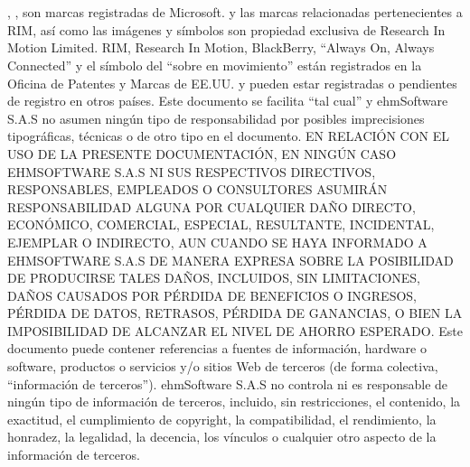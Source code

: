 \chapter{}

\microsoft, \windows, \excel son marcas registradas de Microsoft.
\blackberry y las marcas relacionadas pertenecientes a RIM, as\'i como las
im\'agenes y
s\'imbolos son propiedad exclusiva de Research In Motion Limited. RIM, Research
In
Motion,
BlackBerry, ``Always On, Always Connected'' y el s\'imbolo del ``sobre
en movimiento''
est\'an
registrados en la Oficina de Patentes y Marcas de EE.UU. y pueden estar
registradas o
pendientes de registro en otros pa\'ises.
Este documento se facilita ``tal cual'' y ehmSoftware S.A.S no asumen ning\'un
tipo
de
responsabilidad por posibles imprecisiones tipogr\'aficas, t\'ecnicas o de otro
tipo
en el
documento.
EN RELACI\'ON CON EL USO DE LA PRESENTE DOCUMENTACI\'ON, EN NING\'UN
CASO EHMSOFTWARE S.A.S NI SUS RESPECTIVOS DIRECTIVOS, RESPONSABLES,
EMPLEADOS O CONSULTORES ASUMIR\'AN RESPONSABILIDAD ALGUNA POR
CUALQUIER DA\~NO DIRECTO, ECON\'OMICO, COMERCIAL, ESPECIAL, RESULTANTE,
INCIDENTAL, EJEMPLAR O INDIRECTO, AUN CUANDO SE HAYA INFORMADO A
EHMSOFTWARE S.A.S DE MANERA EXPRESA SOBRE LA POSIBILIDAD DE PRODUCIRSE
TALES DA\~NOS, INCLUIDOS, SIN LIMITACIONES, DA\~NOS CAUSADOS POR P\'ERDIDA DE
BENEFICIOS O INGRESOS, P\'ERDIDA DE DATOS, RETRASOS, P\'ERDIDA DE GANANCIAS,
O BIEN LA IMPOSIBILIDAD DE ALCANZAR EL NIVEL DE AHORRO ESPERADO.
Este documento puede contener referencias a fuentes de informaci\'on, hardware o
software,
productos o servicios y/o sitios Web de terceros (de forma colectiva,
``informaci\'on de
terceros''). ehmSoftware S.A.S no controla ni es responsable de ning\'un tipo de
informaci\'on de
terceros, incluido, sin restricciones, el contenido, la exactitud, el
cumplimiento de copyright, la
compatibilidad, el rendimiento, la honradez, la legalidad, la decencia, los
v\'inculos o cualquier
otro aspecto de la informaci\'on de terceros.